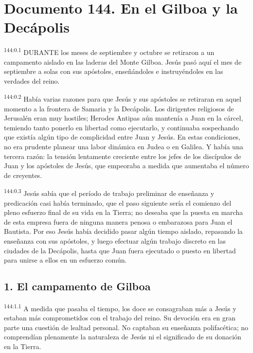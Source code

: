 \chapter{Documento 144. En el Gilboa y la Decápolis}
\par
\textsuperscript{144:0.1} DURANTE los meses de septiembre y octubre se retiraron a un campamento aislado en las laderas del Monte Gilboa. Jesús pasó aquí el mes de septiembre a solas con sus apóstoles, enseñándoles e instruyéndoles en las verdades del reino.

\par
\textsuperscript{144:0.2} Había varias razones para que Jesús y sus apóstoles se retiraran en aquel momento a la frontera de Samaria y la Decápolis. Los dirigentes religiosos de Jerusalén eran muy hostiles; Herodes Antipas aún mantenía a Juan en la cárcel, temiendo tanto ponerlo en libertad como ejecutarlo, y continuaba sospechando que existía algún tipo de complicidad entre Juan y Jesús. En estas condiciones, no era prudente planear una labor dinámica en Judea o en Galilea. Y había una tercera razón: la tensión lentamente creciente entre los jefes de los discípulos de Juan y los apóstoles de Jesús, que empeoraba a medida que aumentaba el número de creyentes.

\par
\textsuperscript{144:0.3} Jesús sabía que el período de trabajo preliminar de enseñanza y predicación casi había terminado, que el paso siguiente sería el comienzo del pleno esfuerzo final de su vida en la Tierra; no deseaba que la puesta en marcha de esta empresa fuera de ninguna manera penosa o embarazosa para Juan el Bautista. Por eso Jesús había decidido pasar algún tiempo aislado, repasando la enseñanza con sus apóstoles, y luego efectuar algún trabajo discreto en las ciudades de la Decápolis, hasta que Juan fuera ejecutado o puesto en libertad para unirse a ellos en un esfuerzo común.

\section*{1. El campamento de Gilboa}
\par
\textsuperscript{144:1.1} A medida que pasaba el tiempo, los doce se consagraban más a Jesús y estaban más comprometidos con el trabajo del reino. Su devoción era en gran parte una cuestión de lealtad personal. No captaban su enseñanza polifacética; no comprendían plenamente la naturaleza de Jesús ni el significado de su donación en la Tierra.

